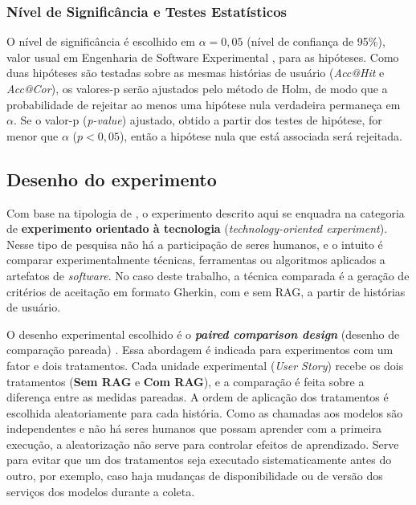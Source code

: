\subsubsection*{Nível de Significância e Testes Estatísticos}

O nível de significância é escolhido em $\alpha = 0{,}05$ (nível de confiança de 95\%), valor usual em Engenharia de Software Experimental \cite{wohlin2000}, para as hipóteses. Como duas hipóteses são testadas sobre as mesmas histórias de usuário (\textit{Acc@Hit} e \textit{Acc@Cor}), os valores-p serão ajustados pelo método de Holm, de modo que a probabilidade de rejeitar ao menos uma hipótese nula verdadeira permaneça em $\alpha$. Se o valor-p (\textit{p-value}) ajustado, obtido a partir dos testes de hipótese, for menor que $\alpha$ ($p < 0{,}05$), então a hipótese nula que está associada será rejeitada.



\subsection{Desenho do experimento}

Com base na tipologia de , o experimento descrito aqui se enquadra na categoria de \textbf{experimento orientado à tecnologia} (\textit{technology-oriented experiment}). Nesse tipo de pesquisa não há a participação de seres humanos, e o intuito é comparar experimentalmente técnicas, ferramentas ou algoritmos aplicados a artefatos de \textit{software}. No caso deste trabalho, a técnica comparada é a geração de critérios de aceitação em formato Gherkin, com e sem RAG, a partir de histórias de usuário.

O desenho experimental escolhido é o \textbf{\textit{paired comparison design}} (desenho de comparação pareada) \cite{wohlin2000}. Essa abordagem é indicada para experimentos com um fator e dois tratamentos. Cada unidade experimental (\textit{User Story}) recebe os dois tratamentos (\textbf{Sem RAG} e \textbf{Com RAG}), e a comparação é feita sobre a diferença entre as medidas pareadas. A ordem de aplicação dos tratamentos é escolhida aleatoriamente para cada história. Como as chamadas aos modelos são independentes e não há seres humanos que possam aprender com a primeira execução, a aleatorização não serve para controlar efeitos de aprendizado. Serve para evitar que um dos tratamentos seja executado sistematicamente antes do outro, por exemplo, caso haja mudanças de disponibilidade ou de versão dos serviços dos modelos durante a coleta.

